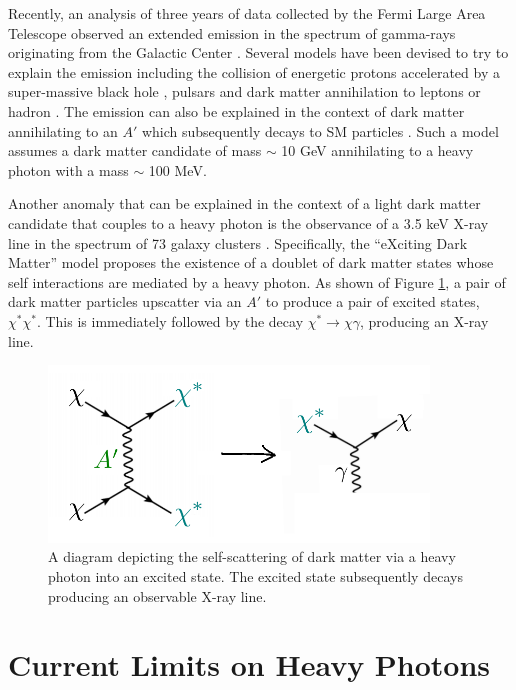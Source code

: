 Recently, an analysis of three years of data collected by the Fermi Large Area
Telescope observed an extended emission in the spectrum of gamma-rays 
originating from the Galactic Center 
\cite{hooper2011, linden2011, abazajian2012, hooper2013}.  Several models have been 
devised to try to explain the emission including the collision of energetic 
protons accelerated by a super-massive black hole \cite{Hooper:2010mq}, 
pulsars \cite{Abazajian:2010zy} and dark matter annihilation to leptons or 
hadron \cite{Hooper:2010mq, Goodenough:2009gk}.  The emission can also
be explained in the context of dark matter annihilating to an $A'$ which 
subsequently decays to SM particles \cite{Hooper:2012cw}.  Such a model assumes
a dark matter candidate of mass $\sim$ 10 GeV annihilating to a heavy photon
with a mass $\sim$ 100 MeV. 

Another anomaly that can be explained in the context of a light dark matter
candidate that couples to a heavy photon is the observance
of a 3.5 keV X-ray line in the spectrum of 73 galaxy clusters \cite{Bulbul:2014sua}.  
Specifically, the ``eXciting Dark Matter'' model \cite{Finkbeiner:2014sja} 
proposes the existence of a doublet of dark matter states whose self interactions are 
mediated by a heavy photon. As shown of Figure \ref{fig:dm_self_scat}, a pair
of dark matter particles upscatter via an $A'$ to produce a pair of excited states, 
$\chi^*\chi^*$. This is immediately followed by the decay 
$\chi^* \rightarrow  \chi\gamma$, producing an X-ray line.
\begin{figure}[t]
    \centering
    \includegraphics[width=0.9\textwidth]{images/xdm.png}
    \caption{A diagram depicting the self-scattering of dark matter via a heavy
             photon into an excited state. The excited state subsequently decays
             producing an observable X-ray line.}
    \label{fig:dm_self_scat}
\end{figure}


\section{Current Limits on Heavy Photons} \label{sec:current_limits}

